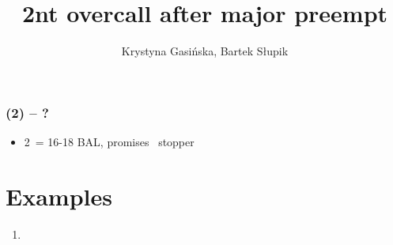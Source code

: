 \documentclass[12pt, a4paper]{article}
\title{2nt overcall after major preempt}
\author{Krystyna Gasińska, Bartek Słupik}
\begin{document}
\maketitle


\subsubsection*{(2\majs) -- ?}
\begin{itemize}
    \item 2\nt\ = 16-18 BAL, promises \majs\ stopper
\end{itemize}


\section{Examples}

\begin{enumerate}
    \item
        
        
\end{enumerate}
\end{document}
